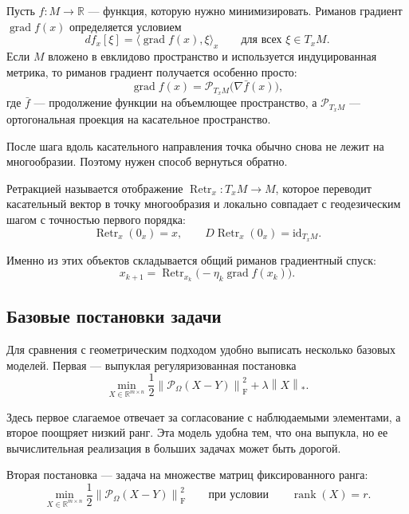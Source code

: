 \documentclass[a4paper,12pt]{article}
\newcommand{\R}{\mathbb{R}}
\newcommand{\fro}[1]{\left\lVert #1 \right\rVert_{\mathrm F}}
\newcommand{\nuc}[1]{\left\lVert #1 \right\rVert_*}
\newcommand{\rank}{\operatorname{rank}}
\newcommand{\grad}{\operatorname{grad}}
\renewcommand{\Proj}{\mathcal{P}}
\newcommand{\Retr}{\operatorname{Retr}}
\begin{document}
Пусть $f:M\to\R$ --- функция, которую нужно минимизировать. Риманов градиент $\grad f(x)$ определяется условием
\[
df_x[\xi] = \langle \grad f(x), \xi \rangle_x
\qquad \text{для всех } \xi \in T_xM.
\]
Если $M$ вложено в евклидово пространство и используется индуцированная метрика, то риманов градиент получается особенно просто:
\begin{equation}
\label{eq:riemannian-gradient-projection}
\grad f(x) = \Proj_{T_xM}\bigl(\nabla \bar f(x)\bigr),
\end{equation}
где $\bar f$ --- продолжение функции на объемлющее пространство, а $\Proj_{T_xM}$ --- ортогональная проекция на касательное пространство.

После шага вдоль касательного направления точка обычно снова не лежит на многообразии. Поэтому нужен способ вернуться обратно.
\begin{definition}
Ретракцией называется отображение $\Retr_x:T_xM\to M$, которое переводит касательный вектор в точку многообразия и локально совпадает с геодезическим шагом с точностью первого порядка:
\[
\Retr_x(0_x)=x, \qquad D\Retr_x(0_x)=\mathrm{id}_{T_xM}.
\]
\end{definition}

Именно из этих объектов складывается общий риманов градиентный спуск:
\[
x_{k+1}=\Retr_{x_k}\bigl(-\eta_k \grad f(x_k)\bigr).
\]

\subsection{Базовые постановки задачи}

Для сравнения с геометрическим подходом удобно выписать несколько базовых моделей. Первая --- выпуклая регуляризованная постановка
\begin{equation}
\label{eq:convex}
\min_{X \in \R^{m\times n}}
\frac12 \fro{\Proj_\Omega(X-Y)}^2 + \lambda \nuc{X}.
\end{equation}

Здесь первое слагаемое отвечает за согласование с наблюдаемыми элементами, а второе поощряет низкий ранг. Эта модель удобна тем, что она выпукла, но ее вычислительная реализация в больших задачах может быть дорогой.

Вторая постановка --- задача на множестве матриц фиксированного ранга:
\begin{equation}
\label{eq:fixed-rank}
\min_{X \in \R^{m\times n}} \frac12 \fro{\Proj_\Omega(X-Y)}^2
\qquad \text{при условии} \qquad \rank(X)=r.
\end{equation}
\end{document}
